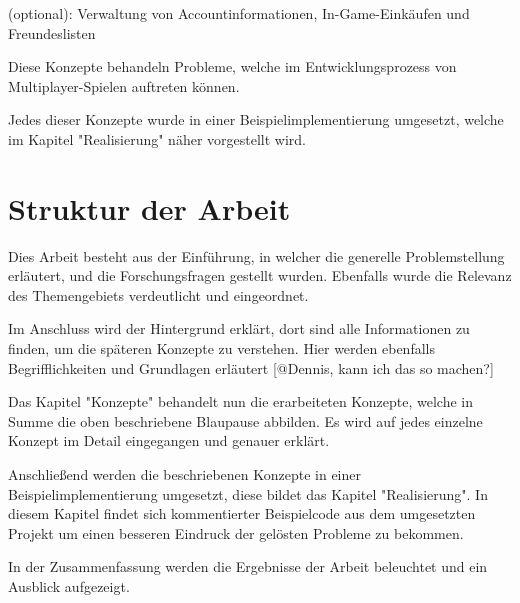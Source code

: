 (optional): Verwaltung von Accountinformationen, In-Game-Einkäufen und Freundeslisten

Diese Konzepte behandeln Probleme, welche im Entwicklungsprozess von Multiplayer-Spielen auftreten können. 

Jedes dieser Konzepte wurde in einer Beispielimplementierung umgesetzt, welche im Kapitel "Realisierung" näher vorgestellt wird.

\section{Struktur der Arbeit}

Dies Arbeit besteht aus der Einführung, in welcher die generelle Problemstellung erläutert, und die Forschungsfragen gestellt wurden. Ebenfalls wurde die Relevanz des Themengebiets verdeutlicht und eingeordnet.

Im Anschluss wird der Hintergrund erklärt, dort sind alle Informationen zu finden, um die späteren Konzepte zu verstehen. Hier werden ebenfalls Begrifflichkeiten und Grundlagen erläutert [@Dennis, kann ich das so machen?]

Das Kapitel "Konzepte" behandelt nun die erarbeiteten Konzepte, welche in Summe die oben beschriebene Blaupause abbilden. Es wird auf jedes einzelne Konzept im Detail eingegangen und genauer erklärt. 
 
Anschließend werden die beschriebenen Konzepte in einer Beispielimplementierung umgesetzt, diese bildet das Kapitel "Realisierung". In diesem Kapitel findet sich kommentierter Beispielcode aus dem umgesetzten Projekt um einen besseren Eindruck der gelösten Probleme zu bekommen.

In der Zusammenfassung werden die Ergebnisse der Arbeit beleuchtet und ein Ausblick aufgezeigt.
